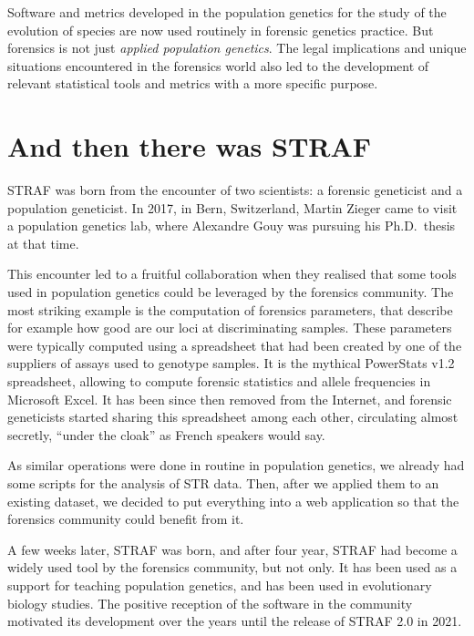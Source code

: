 \documentclass[
  a5paper]{book}
\begin{document}
Software and metrics developed in the population genetics for the study of the
evolution of species are now used routinely in forensic genetics practice.
But forensics is not just \emph{applied population genetics}. The legal implications
and unique situations encountered in the forensics world also led to the
development of relevant statistical tools and metrics with a more specific purpose.

\hypertarget{and-then-there-was-straf}{%
\section*{And then there was STRAF}\label{and-then-there-was-straf}}

STRAF was born from the encounter of two scientists: a forensic geneticist and
a population geneticist. In 2017, in Bern, Switzerland, Martin Zieger came to
visit a population genetics lab, where Alexandre Gouy was pursuing his
Ph.D.~thesis at that time.

This encounter led to a fruitful collaboration when they realised that some tools
used in population genetics could be leveraged by the forensics community. The
most striking example is the computation of forensics parameters, that describe
for example how good are our loci at discriminating samples. These
parameters were typically computed using a spreadsheet that had been created by
one of the suppliers of assays used to genotype samples. It is the mythical
PowerStats v1.2 spreadsheet, allowing to compute forensic statistics and allele
frequencies in Microsoft Excel. It has been since then removed from the Internet,
and forensic geneticists started sharing this spreadsheet among each other, circulating
almost secretly, ``under the cloak'' as French speakers would say.

As similar operations were done in routine in population genetics, we already had
some scripts for the analysis of STR data. Then, after we applied them to an existing
dataset, we decided to put everything into a web application so that the forensics
community could benefit from it.

A few weeks later, STRAF was born, and after four year, STRAF had become a
widely used tool by the forensics community, but not only.
It has been used as a support for teaching population genetics, and has
been used in evolutionary biology studies.
The positive reception of the software in the community motivated its
development over the years until the release of STRAF 2.0 in 2021.
\end{document}
